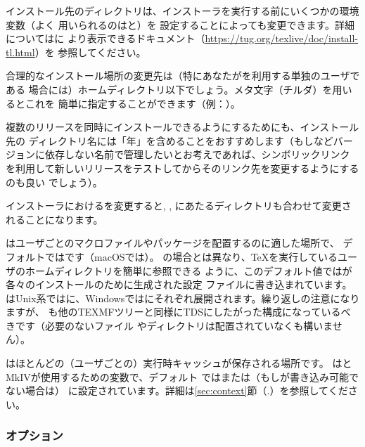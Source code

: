 \documentclass[uplatex,dvipdfmx,12pt,tombow]{jsarticle}
\begin{document}
インストール先のディレクトリは、インストーラを実行する前にいくつかの環境変数（よく
用いられるのはと）を
設定することによっても変更できます。詳細についてはに
より表示できるドキュメント（\url{https://tug.org/texlive/doc/install-tl.html}）を
参照してください。

合理的なインストール場所の変更先は（特にあなたが\TL を利用する単独のユーザである
場合には）ホームディレクトリ以下でしょう。メタ文字\dir{~}（チルダ）を用いるとこれを
簡単に指定することができます（例：）。

複数の\TL リリースを同時にインストールできるようにするためにも、インストール先の
ディレクトリ名には「年」を含めることをおすすめします（もしなどバージョンに依存しない名前で管理したいとお考えであれば、シンボリックリンク
を利用して新しいリリースをテストしてからそのリンク先を変更するようにするのも良い
でしょう）。

インストーラにおけるを変更すると, ,
にあたるディレクトリも合わせて変更されることになります。

はユーザごとのマクロファイルやパッケージを配置するのに適した場所で、
デフォルトではです（macOSでは）。%
の場合とは異なり、\TeX を実行しているユーザのホームディレクトリを簡単に参照できる
ように、このデフォルト値では\dir{~}が各々のインストールのために生成された設定
ファイルに書き込まれています。\dir{~}はUnix系ではに、Windowsではにそれぞれ展開されます。繰り返しの注意になりますが、%
も他のTEXMFツリーと同様にTDSにしたがった構成になっているべきです（必要のないファイル
やディレクトリは配置されていなくも構いません）。

はほとんどの（ユーザごとの）実行時キャッシュが保存される場所です。
は\LuaLaTeX と{\ConTeXt} MkIVが使用するための変数で、デフォルト
ではまたは（もしが書き込み可能でない場合は）
に設定されています。詳細は\ref{sec:context}節（\p.\pageref{%
sec:context}）を参照してください。

\subsubsection{オプション}
\label{sec:options}
\end{document}
